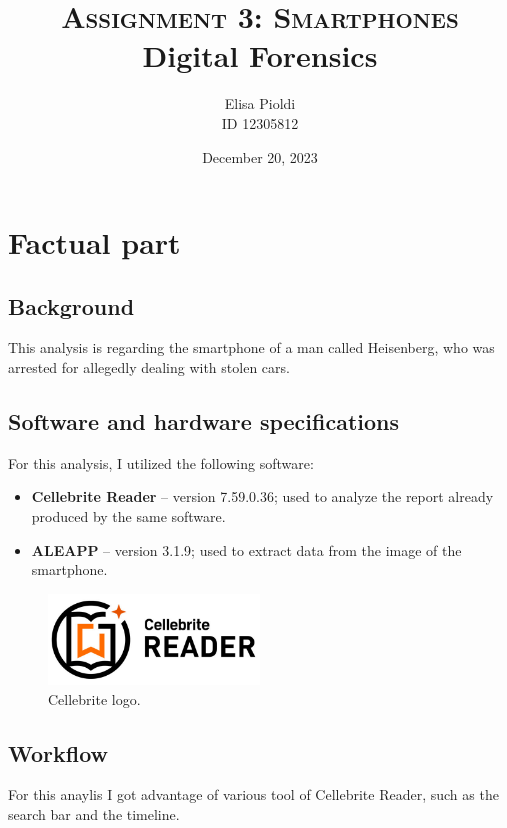 \documentclass[12pt]{article}
\title{\textbf{\textsc{Assignment 3: Smartphones}}\\Digital Forensics}
\author{Elisa Pioldi\\
        ID 12305812}
\date{December 20, 2023}
\begin{document}
\maketitle

\section{Factual part}

\subsection{Background}

This analysis is regarding the smartphone of a man called Heisenberg, who was arrested for allegedly dealing with stolen cars.

\subsection{Software and hardware specifications}
\label{sec:specs}

For this analysis, I utilized the following software:

\begin{itemize}
    \item \textbf{Cellebrite Reader} \cite{cellebrity} -- version 7.59.0.36; used to analyze the report already produced by the same software.
    \item \textbf{ALEAPP} \cite{aleapp} -- version 3.1.9; used to extract data from the image of the smartphone.
\end{itemize}

\begin{figure}[!ht]
    \centering
    \includegraphics[width=0.5\textwidth]{images/cellebrite.jpg}
    \caption{Cellebrite logo.}
\end{figure}

\subsection{Workflow}

For this anaylis I got advantage of various tool of Cellebrite Reader, such as the search bar and the timeline.
\end{document}
